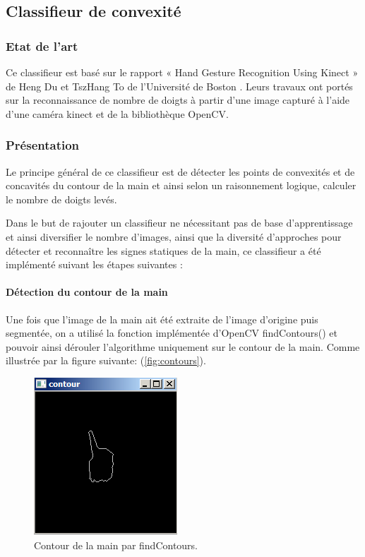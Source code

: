 \subsection{Classifieur de convexité}
\subsubsection{Etat de l'art}
Ce classifieur est basé sur le rapport « Hand Gesture Recognition Using Kinect » de Heng Du et TszHang To de l’Université de Boston \cite{hengDuEtAl}.  Leurs travaux ont portés sur la reconnaissance de nombre de doigts à partir d’une image capturé à l’aide d’une caméra kinect et de la bibliothèque OpenCV. 

\subsubsection{Présentation}

Le principe général de ce classifieur est de détecter les points de convexités et de concavités du contour de la main et ainsi selon un raisonnement logique, calculer le nombre de doigts levés.

Dans le but de rajouter un classifieur ne nécessitant pas de base d’apprentissage et ainsi diversifier le nombre d’images, ainsi que la diversité d’approches pour détecter et reconnaître les signes statiques de la main, ce classifieur a été implémenté suivant les étapes suivantes :

\paragraph{Détection du contour de la main}
Une fois que l’image de la main ait été extraite de l’image d’origine puis segmentée, on a utilisé la fonction implémentée d’OpenCV findContours() et pouvoir ainsi dérouler l’algorithme uniquement sur le contour de la main. Comme illustrée par la figure suivante:  (\autoref{fig:contours}).

\begin{figure}[htb!]
\centerline{\includegraphics{contours.png}}
\caption{Contour de la main par findContours.}
\label{fig:contours}
\end{figure}

